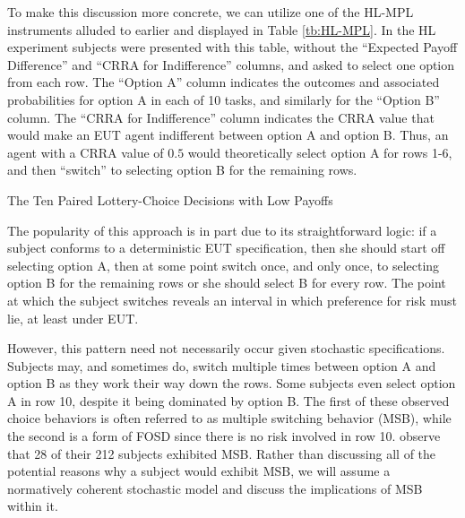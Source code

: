 \documentclass[../main.tex]{subfiles}
\begin{document}
To make this discussion more concrete, we can utilize one of the HL-MPL instruments alluded to earlier and displayed in Table \ref{tb:HL-MPL}.
In the HL experiment subjects were presented with this table, without the \enquote{Expected Payoff Difference} and \enquote{CRRA for Indifference} columns, and asked to select one option from each row.
The \enquote{Option A} column indicates the outcomes and associated probabilities for option A in each of 10 tasks, and similarly for the \enquote{Option B} column.
The \enquote{CRRA for Indifference} column indicates the CRRA value that would make an EUT agent indifferent between option A and option B.
Thus, an agent with a CRRA value of $0.5$ would theoretically select option A for rows 1-6, and then \enquote{switch} to selecting option B for the remaining rows.

\begin{table}[ht]
	\centering
	\captionsetup{justification=centering}
	\caption{The Ten Paired Lottery-Choice Decisions with Low Payoffs \newline \textcite[1645]{Holt2002} }
	\label{tb:HL-MPL}
	\begin{adjustbox}{width=1\textwidth}
	\end{adjustbox}
\end{table}

The popularity of this approach is in part due to its straightforward logic:
if a subject conforms to a deterministic EUT specification, then she should start off selecting option A, then at some point switch once, and only once, to selecting option B for the remaining rows or she should select B for every row.
The point at which the subject switches reveals an interval in which preference for risk must lie, at least under EUT.

However, this pattern need not necessarily occur given stochastic specifications.
Subjects may, and sometimes do, switch multiple times between option A and option B as they work their way down the rows.
Some subjects even select option A in row 10, despite it being dominated by option B.
The first of these observed choice behaviors is often referred to as multiple switching behavior (MSB), while the second is a form of FOSD since there is no risk involved in row 10.
\textcite[1647]{Holt2002} observe that 28 of their 212 subjects exhibited MSB.
Rather than discussing all of the potential reasons why a subject would exhibit MSB, we will assume a normatively coherent stochastic model and discuss the implications of MSB within it.
\end{document}
